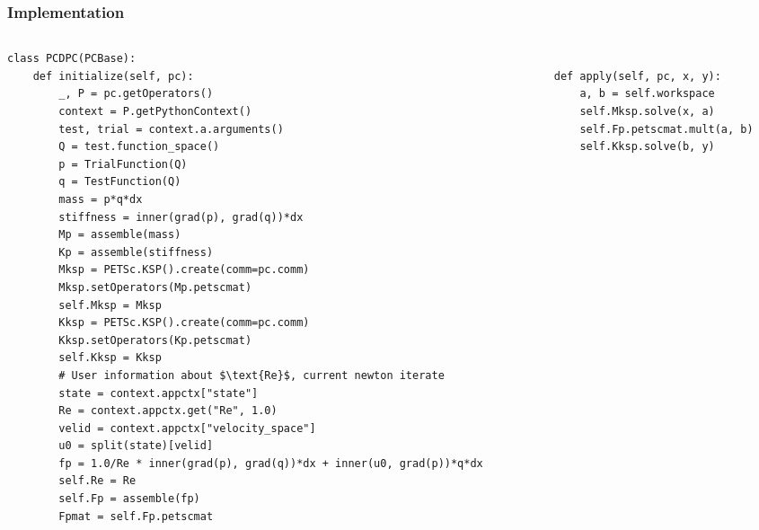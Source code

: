 \documentclass[presentation]{beamer}
\begin{document}
\begin{frame}[fragile]
  \frametitle{Implementation}
  \begin{columns}
    \begin{column}{0.5\textwidth}
\begin{verbatim}
class PCDPC(PCBase):
    def initialize(self, pc):
        _, P = pc.getOperators()
        context = P.getPythonContext()
        test, trial = context.a.arguments()
        Q = test.function_space()
        p = TrialFunction(Q)
        q = TestFunction(Q)
        mass = p*q*dx
        stiffness = inner(grad(p), grad(q))*dx
        Mp = assemble(mass)
        Kp = assemble(stiffness)
        Mksp = PETSc.KSP().create(comm=pc.comm)
        Mksp.setOperators(Mp.petscmat)
        self.Mksp = Mksp
        Kksp = PETSc.KSP().create(comm=pc.comm)
        Kksp.setOperators(Kp.petscmat)
        self.Kksp = Kksp
        # User information about $\text{Re}$, current newton iterate
        state = context.appctx["state"]
        Re = context.appctx.get("Re", 1.0)
        velid = context.appctx["velocity_space"]
        u0 = split(state)[velid]
        fp = 1.0/Re * inner(grad(p), grad(q))*dx + inner(u0, grad(p))*q*dx
        self.Re = Re
        self.Fp = assemble(fp)
        Fpmat = self.Fp.petscmat
\end{verbatim}
    \end{column}
    \begin{column}{0.5\textwidth}
\begin{verbatim}

    def apply(self, pc, x, y):
        a, b = self.workspace
        self.Mksp.solve(x, a)
        self.Fp.petscmat.mult(a, b)
        self.Kksp.solve(b, y)

\end{verbatim}
    \end{column}
  \end{columns}
\end{frame}
\end{document}
